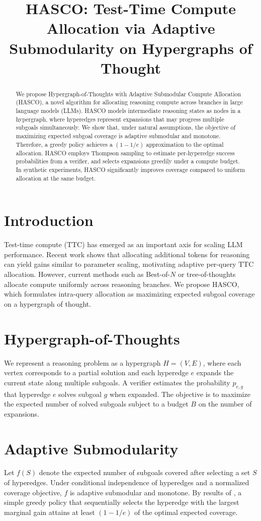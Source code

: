 \documentclass{article}
\title{HASCO: Test-Time Compute Allocation via Adaptive Submodularity on Hypergraphs of Thought}
\author{}
\date{}
\begin{document}
\maketitle

\begin{abstract}
We propose Hypergraph-of-Thoughts with Adaptive Submodular Compute Allocation (HASCO), a novel algorithm for allocating reasoning compute across branches in large language models (LLMs). HASCO models intermediate reasoning states as nodes in a hypergraph, where hyperedges represent expansions that may progress multiple subgoals simultaneously. We show that, under natural assumptions, the objective of maximizing expected subgoal coverage is adaptive submodular and monotone. Therefore, a greedy policy achieves a $(1 - 1/e)$ approximation to the optimal allocation. HASCO employs Thompson sampling to estimate per-hyperedge success probabilities from a verifier, and selects expansions greedily under a compute budget. In synthetic experiments, HASCO significantly improves coverage compared to uniform allocation at the same budget.
\end{abstract}

\section{Introduction}
Test-time compute (TTC) has emerged as an important axis for scaling LLM performance. Recent work shows that allocating additional tokens for reasoning can yield gains similar to parameter scaling, motivating adaptive per-query TTC allocation. However, current methods such as Best-of-$N$ or tree-of-thoughts allocate compute uniformly across reasoning branches. We propose HASCO, which formulates intra-query allocation as maximizing expected subgoal coverage on a hypergraph of thought.

\section{Hypergraph-of-Thoughts}
We represent a reasoning problem as a hypergraph $H=(V,E)$, where each vertex corresponds to a partial solution and each hyperedge $e$ expands the current state along multiple subgoals. A verifier estimates the probability $p_{e,g}$ that hyperedge $e$ solves subgoal $g$ when expanded. The objective is to maximize the expected number of solved subgoals subject to a budget $B$ on the number of expansions.

\section{Adaptive Submodularity}
Let $f(S)$ denote the expected number of subgoals covered after selecting a set $S$ of hyperedges. Under conditional independence of hyperedges and a normalized coverage objective, $f$ is adaptive submodular and monotone. By results of \citet{Golovin2011Adaptive}, a simple greedy policy that sequentially selects the hyperedge with the largest marginal gain attains at least $(1-1/e)$ of the optimal expected coverage.
\end{document}
